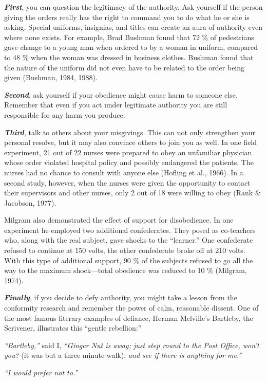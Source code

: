 \documentclass[
]{book}
\begin{document}
\textbf{\emph{First}}, you can question the legitimacy of the authority. Ask yourself if the person giving the orders really has the right to command you to do what he or she is asking. Special uniforms, insignias, and titles can create an aura of authority even where none exists. For example, Brad Bushman found that 72 \% of pedestrians gave change to a young man when ordered to by a woman in uniform, compared to 48 \% when the woman was dressed in business clothes. Bushman found that the nature of the uniform did not even have to be related to the order being given (Bushman, 1984, 1988).

\textbf{\emph{Second}}, ask yourself if your obedience might cause harm to someone else. Remember that even if you act under legitimate authority you are still responsible for any harm you produce.

\textbf{\emph{Third}}, talk to others about your misgivings. This can not only strengthen your personal resolve, but it may also convince others to join you as well. In one field experiment, 21 out of 22 nurses were prepared to obey an unfamiliar physician whose order violated hospital policy and possibly endangered the patients. The nurses had no chance to consult with anyone else (Hofling et al., 1966). In a second study, however, when the nurses were given the opportunity to contact their supervisors and other nurses, only 2 out of 18 were willing to obey (Rank \& Jacobson, 1977).

Milgram also demonstrated the effect of support for disobedience. In one experiment he employed two additional confederates. They posed as co-teachers who, along with the real subject, gave shocks to the ``learner.'' One confederate refused to continue at 150 volts, the other confederate broke off at 210 volts. With this type of additional support, 90 \% of the subjects refused to go all the way to the maximum shock---total obedience was reduced to 10 \% (Milgram, 1974).

\textbf{\emph{Finally}}, if you decide to defy authority, you might take a lesson from the conformity research and remember the power of calm, reasonable dissent. One of the most famous literary examples of defiance, Herman Melville's Bartleby, the Scrivener, illustrates this ``gentle rebellion:''

\emph{``Bartleby,''} said I, \emph{``Ginger Nut is away; just step round to the Post Office, won't you?} (it was but a three minute walk), \emph{and see if there is anything for me.''}

\emph{``I would prefer not to.''}
\end{document}
